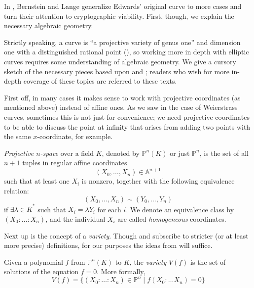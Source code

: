 
In \cite{bernstein2007faster}, Bernstein and Lange generalize Edwards' original
    curve to more cases and turn their attention to cryptographic viability.
First, though, we explain the necessary algebraic geometry.


Strictly speaking, a curve is ``a projective variety of genus one'' and
    dimension one with a distinguished rational point
    (\cite{silverman2009arithmetic}), so working more in depth with elliptic
    curves requires some understanding of algebraic geometry.
We give a cursory sketch of the necessary pieces based upon
    \cite{silverman2009arithmetic} and \cite{hartshorne1977algebraic}; readers
    who wish for more in-depth coverage of these topics are referred to these
    texts.

First off, in many cases it makes sense to work with projective coordinates (as
    mentioned above) instead of affine ones.
As we saw in the case of Weierstrass curves, sometimes this is not just for
    convenience; we need projective coordinates to be able to discuss the point
    at infinity that arises from adding two points with the same
    $x$-coordinate, for example.
\begin{dfn}
\textit{Projective $n$-space} over a field $K$, denoted by $\mathbb{P}^n(K)$ or
    just $\mathbb{P}^n$, is the set of all $n + 1$ tuples in regular affine
    coordinates
\[
(X_0 , \ldots, X_n) \in \mathbb{A}^{n + 1}
\]
    such that at least one $X_i$ is nonzero, together with the following
    equivalence relation:
\[
(X_0 , \ldots, X_n) \sim (Y_0, \ldots, Y_n)
\]
    if $\exists \lambda \in \overline{K}^\ast$ such that $X_i = \lambda Y_i$
    for each $i$.
We denote an equivalence class by $(X_0 : \ldots: X_n)$, and the individual
    $X_i$ are called \textit{homogeneous} coordinates.
\end{dfn}

Next up is the concept of a \textit{variety}.
Though \cite{silverman2009arithmetic} and \cite{hartshorne1977algebraic}
    subscribe to stricter (or at least more precise) definitions, for our
    purposes the ideas from \cite{adams1994introduction} will suffice.
\begin{dfn}
Given a polynomial $f$ from $\mathbb{P}^n(K)$ to $K$, the \textit{variety}
    $V(f)$ is the set of solutions of the equation $f = 0$.
More formally,
\[
V(f) = \{(X_0 : \ldots: X_n) \in \mathbb{P}^n \mid f(X_0 : \ldots X_n) = 0\}
\]
\end{dfn}

